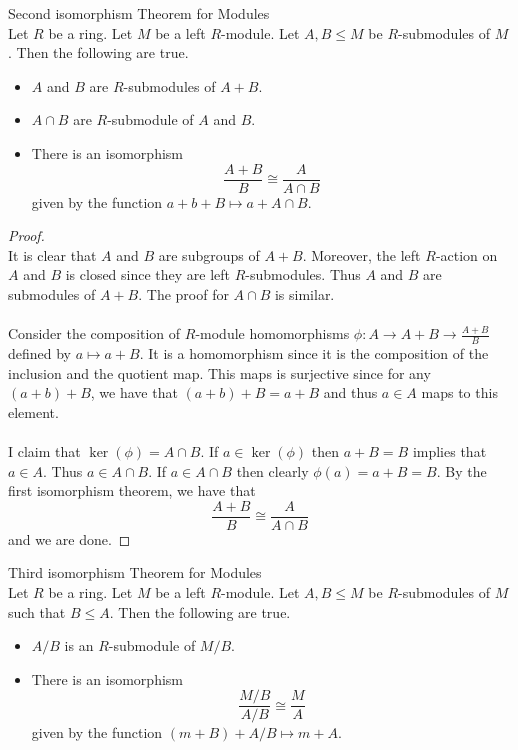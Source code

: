 \documentclass[a4paper]{article}
\begin{document}
\begin{thm}{Second isomorphism Theorem for Modules}{}\\
Let $R$ be a ring. Let $M$ be a left $R$-module. Let $A,B\leq M$ be $R$-submodules of $M$. Then the following are true. 
\begin{itemize}
\item $A$ and $B$ are $R$-submodules of $A+B$. 
\item $A\cap B$ are $R$-submodule of $A$ and $B$. 
\item There is an isomorphism $$\frac{A+B}{B}\cong\frac{A}{A\cap B}$$ given by the function $a+b+B\mapsto a+A\cap B$. 
\end{itemize}
\begin{proof}\\
It is clear that $A$ and $B$ are subgroups of $A+B$. Moreover, the left $R$-action on $A$ and $B$ is closed since they are left $R$-submodules. Thus $A$ and $B$ are submodules of $A+B$. The proof for $A\cap B$ is similar. \\~\\

Consider the composition of $R$-module homomorphisms $\phi:A\to A+B\to\frac{A+B}{B}$ defined by $a\mapsto a+B$. It is a homomorphism since it is the composition of the inclusion and the quotient map. This maps is surjective since for any $(a+b)+B$, we have that $(a+b)+B=a+B$ and thus $a\in A$ maps to this element. \\~\\
I claim that $\ker(\phi)=A\cap B$. If $a\in\ker(\phi)$ then $a+B=B$ implies that $a\in A$. Thus $a\in A\cap B$. If $a\in A\cap B$ then clearly $\phi(a)=a+B=B$. By the first isomorphism theorem, we have that $$\frac{A+B}{B}\cong\frac{A}{A\cap B}$$ and we are done. 
\end{proof}
\end{thm}

\begin{thm}{Third isomorphism Theorem for Modules}{}\\
Let $R$ be a ring. Let $M$ be a left $R$-module. Let $A,B\leq M$ be $R$-submodules of $M$ such that $B\leq A$. Then the following are true. 
\begin{itemize}
\item $A/B$ is an $R$-submodule of $M/B$. 
\item There is an isomorphism $$\frac{M/B}{A/B}\cong\frac{M}{A}$$ given by the function $(m+B)+A/B\mapsto m+A$. 
\end{itemize}
\end{thm}
\end{document}
